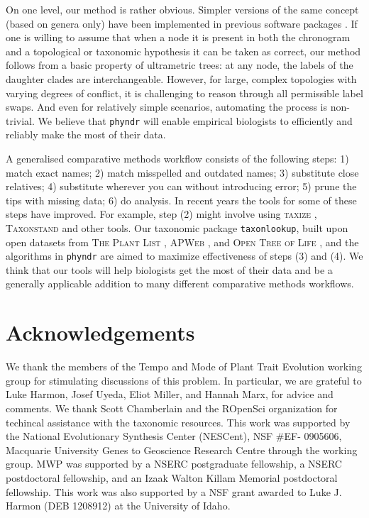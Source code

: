 \documentclass[a4paper,11pt]{article}
\newcommand{\phyndr}{\tt phyndr}
\newcommand{\taxonlookup}{\tt taxonlookup}
\begin{document}
On one level, our method is rather obvious. Simpler versions of the same concept (based on genera only) have been implemented in previous software packages \citep[e.g., \textsc{phyloGenerator};][]{pearse2013phylogenerator}.  If one is willing to assume that when a node it is present in both the chronogram and a topological or taxonomic hypothesis it can be taken as correct, our method follows from a basic property of ultrametric trees: at any node, the labels of the daughter clades are interchangeable. However, for large, complex topologies with varying degrees of conflict, it is challenging to reason through all permissible label swaps. And even for relatively simple scenarios, automating the process is non-trivial. We believe that {\phyndr} will enable empirical biologists to efficiently and reliably make the most of their data.

A generalised comparative methods workflow consists of the following steps:  1) match exact names; 2) match misspelled and outdated names; 3) substitute close relatives; 4) substitute wherever you can without introducing error; 5) prune the tips with missing data; 6) do analysis.  In recent years the tools for some of these steps have improved.  For example, step (2) might involve using \textsc{taxize} \citep{taxize}, \textsc{Taxonstand} \citep{cayuela2012} and other tools.
%
%
Our taxonomic package {\taxonlookup}, built upon open datasets from \textsc{The Plant List} \citep{ThePlantList}, \textsc{APWeb} \citep{apweb}, and \textsc{Open Tree of Life} \citep{OpenTree}, and the algorithms in {\phyndr} are aimed to maximize effectiveness of steps (3) and (4). We think that our tools will help biologists get the most of their data and be a generally applicable addition to many different comparative methods workflows.

\section{Acknowledgements}
We thank the members of the Tempo and Mode of Plant Trait
Evolution working group for stimulating discussions of this problem. In particular, we are grateful to Luke Harmon, Josef Uyeda, Eliot Miller, and Hannah Marx, for advice and comments. We thank Scott Chamberlain and the ROpenSci organization for techincal assistance with the taxonomic resources. This work was supported by the National Evolutionary Synthesis Center
(NESCent), NSF \#EF- 0905606, Macquarie University Genes to Geoscience
Research Centre through the working group. MWP was supported by a NSERC postgraduate fellowship, a NSERC postdoctoral fellowship, and an Izaak Walton Killam Memorial postdoctoral fellowship. This work was also supported by a NSF grant awarded to Luke J. Harmon (DEB 1208912) at the University of Idaho. 
\end{document}
